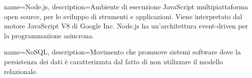 {
	name=Node.js,
	description={Ambiente di esecuzione JavaScript multipiattaforma open source, per lo sviluppo di strumenti e applicazioni. Viene interpretato dal motore JavaScript V8 di Google Inc. Node.js ha un'architettura event-driven per la programmazione asincrona.}
}

{
	name=NoSQL,
	description={Movimento che promuove sistemi software dove la persistenza dei dati è caratterizzata dal fatto di non utilizzare il modello relazionale.}
}